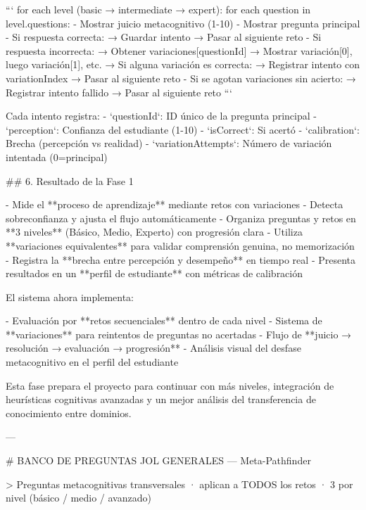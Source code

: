 ```
for each level (basic → intermediate → expert):
  for each question in level.questions:
    - Mostrar juicio metacognitivo (1-10)
    - Mostrar pregunta principal
    - Si respuesta correcta:
        → Guardar intento
        → Pasar al siguiente reto
    - Si respuesta incorrecta:
        → Obtener variaciones[questionId]
        → Mostrar variación[0], luego variación[1], etc.
        → Si alguna variación es correcta:
            → Registrar intento con variationIndex
            → Pasar al siguiente reto
        - Si se agotan variaciones sin acierto:
            → Registrar intento fallido
            → Pasar al siguiente reto
```

Cada intento registra:
- `questionId`: ID único de la pregunta principal
- `perception`: Confianza del estudiante (1-10)
- `isCorrect`: Si acertó
- `calibration`: Brecha (percepción vs realidad)
- `variationAttempts`: Número de variación intentada (0=principal)

## 6. Resultado de la Fase 1

- Mide el **proceso de aprendizaje** mediante retos con variaciones
- Detecta sobreconfianza y ajusta el flujo automáticamente
- Organiza preguntas y retos en **3 niveles** (Básico, Medio, Experto) con progresión clara
- Utiliza **variaciones equivalentes** para validar comprensión genuina, no memorización
- Registra la **brecha entre percepción y desempeño** en tiempo real
- Presenta resultados en un **perfil de estudiante** con métricas de calibración

El sistema ahora implementa:

- Evaluación por **retos secuenciales** dentro de cada nivel
- Sistema de **variaciones** para reintentos de preguntas no acertadas
- Flujo de **juicio → resolución → evaluación → progresión**
- Análisis visual del desfase metacognitivo en el perfil del estudiante

Esta fase prepara el proyecto para continuar con más niveles, integración de heurísticas cognitivas avanzadas y un mejor análisis del transferencia de conocimiento entre dominios.

---

# BANCO DE PREGUNTAS JOL GENERALES — Meta-Pathfinder

> Preguntas metacognitivas transversales · aplican a TODOS los retos · 3 por nivel (básico / medio / avanzado)

